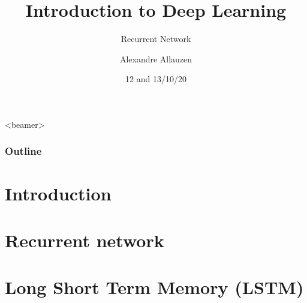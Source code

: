 \documentclass[10pt]{beamer}
\title[IDL@BME-BIN] %
{Introduction to Deep Learning}
\subtitle{Recurrent Network}
\author[A. Allauzen] %
{Alexandre Allauzen}
\institute[ESPCI/Dauphine/PSL] %
{
\texttt{[image: ../logos/espci\_blue.png]}\hfill
\raisebox{1.75ex}{\texttt{[image: ../logos/dauphine.png]}}\\
\hfill\texttt{[image: ../logos/logomiles\_white.pdf]}
}
\date{12 and 13/10/20} %
\begin{document}

\begin{frame}
  \titlepage
\end{frame}

\begin{frame}<beamer>
  \frametitle{Outline}
  \tableofcontents
\end{frame}
 





\section{Introduction}


\section{Recurrent network}


\section{Long Short Term Memory (LSTM)}





{\footnotesize }
\end{document}
